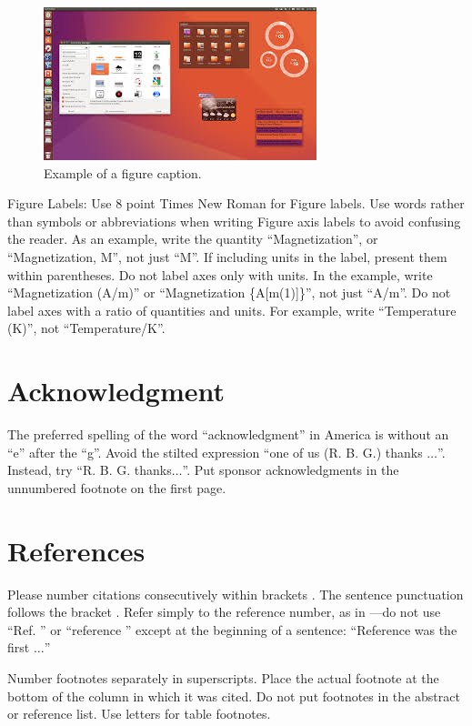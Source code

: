 \documentclass[conference]{IEEEtran}
\begin{document}
\begin{figure}[htbp]
\begin{center}
\includegraphics[width= 0.45 \textwidth]{fig2.jpeg}
\end{center}
\caption{Example of a figure caption.}
\label{fig}
\end{figure}

Figure Labels: Use 8 point Times New Roman for Figure labels. Use words 
rather than symbols or abbreviations when writing Figure axis labels to 
avoid confusing the reader. As an example, write the quantity 
``Magnetization'', or ``Magnetization, M'', not just ``M''. If including 
units in the label, present them within parentheses. Do not label axes only 
with units. In the example, write ``Magnetization (A/m)'' or ``Magnetization 
\{A[m(1)]\}'', not just ``A/m''. Do not label axes with a ratio of 
quantities and units. For example, write ``Temperature (K)'', not 
``Temperature/K''.

\section*{Acknowledgment}

The preferred spelling of the word ``acknowledgment'' in America is without 
an ``e'' after the ``g''. Avoid the stilted expression ``one of us (R. B. 
G.) thanks $\ldots$''. Instead, try ``R. B. G. thanks$\ldots$''. Put sponsor 
acknowledgments in the unnumbered footnote on the first page.

\section*{References}

Please number citations consecutively within brackets \cite{b1}. The 
sentence punctuation follows the bracket \cite{b2}. Refer simply to the reference 
number, as in \cite{b3}---do not use ``Ref. \cite{b3}'' or ``reference \cite{b3}'' except at 
the beginning of a sentence: ``Reference \cite{b3} was the first $\ldots$''

Number footnotes separately in superscripts. Place the actual footnote at 
the bottom of the column in which it was cited. Do not put footnotes in the 
abstract or reference list. Use letters for table footnotes.
\end{document}
